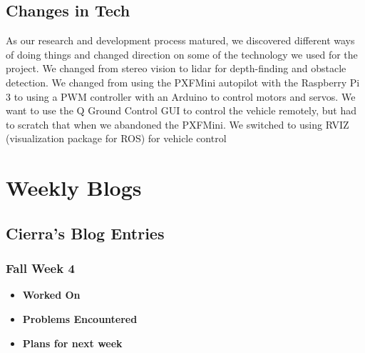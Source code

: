 \documentclass[compsoc,draftclsnofoot,onecolumn,10pt]{IEEEtran}
\begin{document}
    \subsection{Changes in Tech}
    As our research and development process matured, we discovered different ways of doing things and changed direction on some of the technology we used for the project. We changed from stereo vision to lidar for depth-finding and obstacle detection. We changed from using the PXFMini autopilot with the Raspberry Pi 3 to using a PWM controller with an Arduino to control motors and servos. We want to use the Q Ground Control GUI to control the vehicle remotely, but had to scratch that when we abandoned the PXFMini. We switched to using RVIZ (visualization package for ROS) for vehicle control


\section{Weekly Blogs}

\subsection{Cierra's Blog Entries}

\subsubsection{Fall Week 4}
\begin{itemize}
    \item {\textbf{Worked On}}
    \begin{itemize}

    \end{itemize}

    \item {\textbf{Problems Encountered}}
    \begin{itemize}

    \end{itemize}

    \item{\textbf{Plans for next week}}
    \begin{itemize}

    \end{itemize}

\end{itemize}
\end{document}
